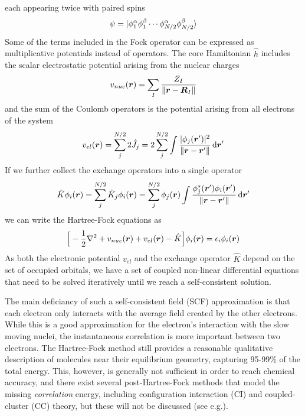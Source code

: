 each appearing twice with paired spins
\begin{equation}
    \psi = |\phi_1^\alpha\phi_1^\beta\cdots
	    \phi_{N/2}^\alpha\phi_{N/2}^\beta\rangle
\end{equation}
Some of the terms included in the Fock operator can be expressed as multiplicative
potentials instead of operators. The core Hamiltonian $\hat{h}$ includes the scalar 
electrostatic potential arising from the nuclear charges
\begin{equation}
    \label{eq:nuc_pot}
    v_{nuc}(\boldsymbol r) = \sum_{I} \frac{Z_I}{\|\boldsymbol r - \boldsymbol R_I\|}
\end{equation}
and the sum of the Coulomb operators is the potential arising from all electrons of the system
\begin{equation}
    v_{el}(\boldsymbol r) = \sum_j^{N/2} 2\hat{J}_j = 2 \sum_j^{N/2} \int \frac{|\phi_j(\boldsymbol r')|^2}
	{\|\boldsymbol r - \boldsymbol r'\|} \,\mathrm{d} \boldsymbol r'
\end{equation}
If we further collect the exchange operators into a single operator
\begin{equation}
    \label{eq:HF_exchange}
    \hat{K}\phi_i(\boldsymbol r) = \sum_j^{N/2} \hat{K}_j \phi_i(\boldsymbol r) 
	= \sum_j^{N/2} \phi_j (\boldsymbol r) \int \frac{\phi_j^{\ast}(\boldsymbol r')\phi_i(\boldsymbol r')}
	    {\|\boldsymbol r - \boldsymbol r'\|} \,\mathrm{d} \boldsymbol r'
\end{equation}
we can write the Hartree-Fock equations as
\begin{equation}
    \label{eq:HF_equations}
    \Big[-\frac{1}{2}\nabla^2 + v_{nuc}(\boldsymbol r) + v_{el}(\boldsymbol r) - \hat{K}\Big]\phi_i(\boldsymbol r) 
	= \epsilon_i \phi_i(\boldsymbol r)
\end{equation}
As both the electronic potential $v_{el}$ and the exchange operator $\hat{K}$ depend on the 
set of occupied orbitals, we have a set of coupled non-linear differential equations that need 
to be solved iteratively until we reach a self-consistent solution. 

The main deficiancy of such a self-consistent field (SCF) approximation is that each electron 
only interacts with the average field created by the other electrons. While this is a good 
approximation for the electron's interaction with the slow moving nuclei, the instantaneous 
correlation is more important between two electrons. The Hartree-Fock method still provides 
a reasonable qualitative description of molecules near their equilibrium geometry, capturing 
95-99\% of the total energy.  This, however, is generally not sufficient in order to reach 
chemical accuracy, and there exist several post-Hartree-Fock methods that model the missing 
\emph{correlation} energy, including configuration interaction (CI) and coupled-cluster (CC)
theory, but these will not be discussed 
(see e.g.\cite{Szabo-Ostlund:1982,Jensen:2007,Helgaker:2000}).

